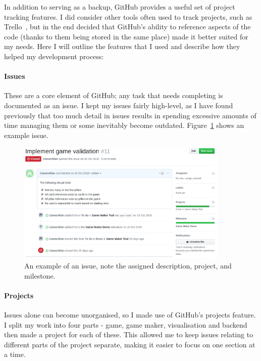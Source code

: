 In addition to serving as a backup, GitHub provides a useful set of project tracking features. 
I did consider other tools often used to track projects, such as Trello~\cite{Trello}, but in the end decided that GitHub's ability to reference aspects of the code (thanks to them being stored in the same place) made it better suited for my needs. 
Here I will outline the features that I used and describe how they helped my development process:

\paragraph{Issues} These are a core element of GitHub; any task that needs completing is documented as an issue.
I kept my issues fairly high-level, as I have found previously that too much detail in issues results in spending excessive amounts of time managing them or some inevitably become outdated. Figure~\ref{fig:issue} shows an example issue.

\begin{figure}[!h]
	\centering
	\includegraphics[width=0.9\textwidth]{./images/softeng/issue.png}
	\caption{An example of an issue, note the assigned description, project, and milestone.}
	\label{fig:issue}
\end{figure}

\paragraph{Projects} Issues alone can become unorganised, so I made use of GitHub's projects feature. 
I split my work into four parts - game, game maker, visualisation and backend then made a project for each of these. 
This allowed me to keep issues relating to different parts of the project separate, making it easier to focus on one section at a time.

